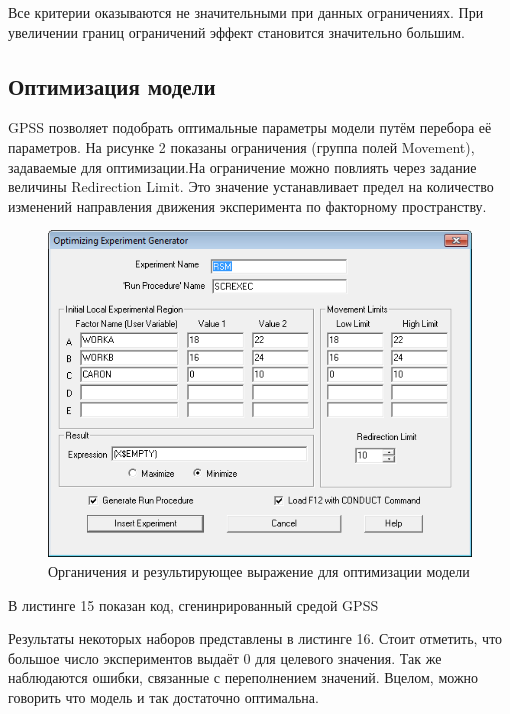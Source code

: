 \documentclass[a4paper, 12pt]{article}        %
\begin{document}
Все критерии оказываются не значительными при данных ограничениях. При увеличении границ ограничений эффект становится значительно большим.

\newpage
\subsection{Оптимизация модели}

GPSS позволяет подобрать оптимальные параметры модели путём перебора её параметров. На рисунке 2 показаны ограничения (группа полей Movement), задаваемые для оптимизации.На ограничение  можно повлиять через задание величины Redirection Limit. Это значение устанавливает предел на количество изменений направления движения эксперимента по факторному пространству.

\begin{figure}[h!]
\centering
\includegraphics[scale=1]{res/pic002}
\caption{Органичения и результирующее выражение для оптимизации модели}
\end{figure}

В листинге 15 показан код, сгенинрированный средой GPSS



Результаты некоторых наборов представлены в листинге 16. Стоит отметить, что большое число экспериментов выдаёт 0 для целевого значения. Так же наблюдаются ошибки, связанные с переполнением значений. Вцелом, можно говорить что модель и так достаточно оптимальна.
\end{document}
